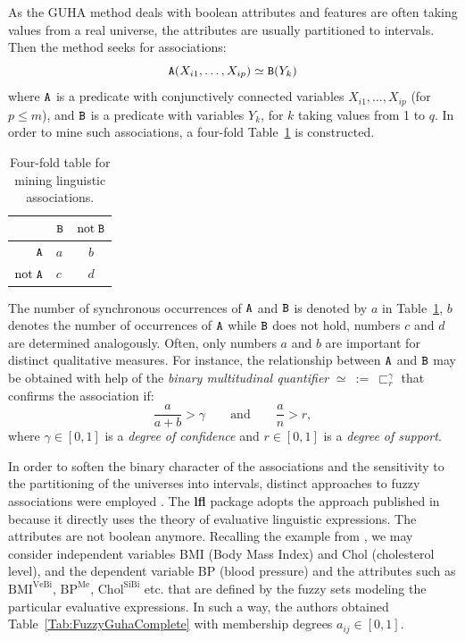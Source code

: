 \documentclass[review]{elsarticle}
\newcommand{\pkg}[1]{\textbf{#1}}
\begin{document}
As the GUHA method deals with boolean attributes and features are often taking values from a real universe, the attributes are usually partitioned to intervals. Then the method seeks for associations:\begin{equation} {\tt A}(X_{i1},\ldots,X_{ip})\simeq
{\tt B}(Y_k) \label{form:assoc_general}
\end{equation}
where ${\tt A}$ is a predicate with conjunctively connected variables $X_{i1},\ldots,
X_{ip}$ (for $p\leq m$), and ${\tt
B}$ is a predicate with variables $Y_k$, for $k$ taking values from 1 to $q$. In order to mine such associations, a four-fold 
Table~\ref{Tab:4fold-guha} is constructed.
\begin{table}[ht]
\centering
\begin{tabular}{|r|lc|}
\hline
  & ${\tt B}$ & $\text{not}\; {\tt B}$ \\
    \hline
    ${\tt A}$ & $a$ & $b$\\
    $\text{not}\; {\tt A}$ & $c$ & $d$\\
    \hline
\end{tabular}
\caption{Four-fold table for mining linguistic associations.} \label{Tab:4fold-guha}
\end{table}



The number of synchronous occurrences of ${\tt A}$ and ${\tt B}$ is denoted by $a$ in Table~\ref{Tab:4fold-guha}, $b$ denotes the number of occurrences of ${\tt A}$ while ${\tt
B}$ does not hold, numbers $c$ and $d$ are determined analogously. Often, only numbers $a$ and $b$ are important for distinct qualitative measures. For instance, the relationship between ${\tt A}$ and ${\tt B}$ may be obtained with help of the \emph{binary multitudinal quantifier} $\simeq\
:=\ \sqsubset^{\gamma}_{r}$ that confirms the association if:
$$\frac{a}{a+b}>\gamma \qquad \textrm{and} \qquad \frac{a}{n}>r,$$
where $\gamma \in [0,1]$ is a \emph{degree of confidence} and
$r\in[0,1]$ is a \emph{degree of support}.



In order to soften the binary character of the associations and the sensitivity to the  partitioning of the universes into intervals, distinct approaches to fuzzy associations were employed
\cite{Sudkamp:2005,Kupka:NNW2010,Glass:FSS2008}.
The \pkg{lfl} package adopts the approach published in \cite{StepBurda:FRBE_FSS} because  it directly uses the theory of evaluative
linguistic expressions. The attributes are not boolean anymore. Recalling the example from \cite{StepBurda:FRBE_FSS}, we may consider independent variables BMI (Body Mass Index) and Chol (cholesterol level), and the dependent variable BP (blood pressure) and the attributes such as $\mathrm{BMI}^{\mathrm{Ve Bi}}$,
$\mathrm{BP}^{\mathrm{Me}}$, $\mathrm{Chol}^{\mathrm{Si Bi}}$
etc. that are defined by the fuzzy sets modeling  the particular evaluative expressions. In such a way, the authors obtained Table~\ref{Tab:FuzzyGuhaComplete}  with membership degrees $a_{ij} \in [0,1]$.
\end{document}
